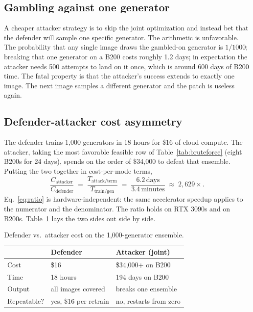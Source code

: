 \documentclass[conference]{IEEEtran}
\begin{document}
\subsection{Gambling against one generator}

A cheaper attacker strategy is to skip the joint optimization and
instead bet that the defender will sample one specific generator. The
arithmetic is unfavorable. The probability that any single image draws
the gambled-on generator is $1/1000$; breaking that one generator on a
B200 costs roughly 1.2 days; in expectation the attacker needs 500
attempts to land on it once, which is around 600 days of B200 time. The
fatal property is that the attacker's success extends to exactly one
image. The next image samples a different generator and the patch is
useless again.

\subsection{Defender-attacker cost asymmetry}

The defender trains 1{,}000 generators in 18 hours for \$16 of cloud
compute. The attacker, taking the most favorable feasible row of
Table~\ref{tab:bruteforce} (eight B200s for 24 days), spends on the
order of \$34{,}000 to defeat that ensemble. Putting the two together
in cost-per-mode terms,
\begin{equation}
    \frac{C_{\text{attacker}}}{C_{\text{defender}}}
    \;=\;
    \frac{T_{\text{attack/term}}}{T_{\text{train/gen}}}
    \;=\;
    \frac{6.2\,\text{days}}{3.4\,\text{minutes}}
    \;\approx\; 2{,}629\times .
    \label{eq:ratio}
\end{equation}
Eq.~\eqref{eq:ratio} is hardware-independent: the same accelerator
speedup applies to the numerator and the denominator. The ratio holds
on RTX 3090s and on B200s.
Table~\ref{tab:asymm} lays the two sides out side by side.

\begin{table}[!t]
\caption{Defender vs.\ attacker cost on the 1{,}000-generator ensemble.}
\label{tab:asymm}
\centering
\renewcommand{\arraystretch}{1.15}
\begin{tabular}{p{} p{} p{}}
\toprule
& \textbf{Defender} & \textbf{Attacker (joint)} \\
\midrule
Cost  & \$16 & \$34{,}000+ on B200 \\
Time  & 18 hours & 194 days on B200 \\
Output & all images covered & breaks one ensemble \\
Repeatable? & yes, \$16 per retrain & no, restarts from zero \\
\bottomrule
\end{tabular}
\end{table}
\end{document}

